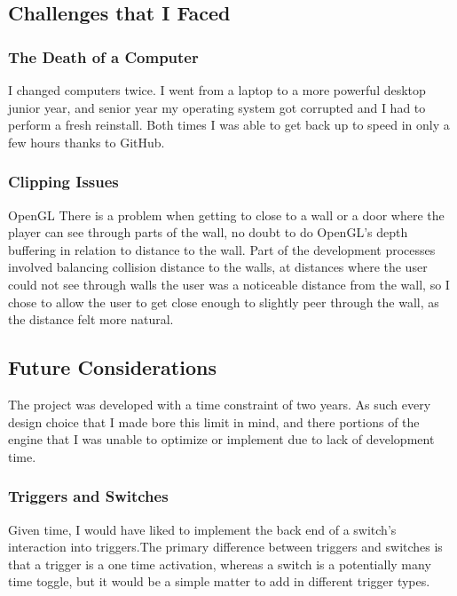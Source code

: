 \documentclass{article}
\begin{document}
\subsection{Challenges that I Faced}
\subsubsection{The Death of a Computer}

I changed computers twice. I went from a laptop to a more powerful desktop junior year, and senior year my operating system got corrupted and I had to perform a fresh reinstall. Both times I was able to get back up to speed in only a few hours thanks to GitHub.

\subsubsection{Clipping Issues}

OpenGL There is a problem when getting to close to a wall or a door where the player can see through parts of the wall, no doubt to do OpenGL's depth buffering in relation to distance to the wall. Part of the development processes involved balancing collision distance to the walls, at distances where the user could not see through walls the user was a noticeable distance from the wall, so I chose to allow the user to get close enough to slightly peer through the wall, as the distance felt more natural.

\subsection{Future Considerations}

The project was developed with a time constraint of two years. As such every design choice that I made bore this limit in mind, and there portions of the engine that I was unable to optimize or implement due to lack of development time.

\subsubsection{Triggers and Switches}

Given time, I would have liked to implement the back end of a switch's interaction into triggers.The primary difference between triggers and switches is that a trigger is a one time activation, whereas a switch is a potentially many time toggle, but it would be a simple matter to add in different trigger types.
\end{document}

